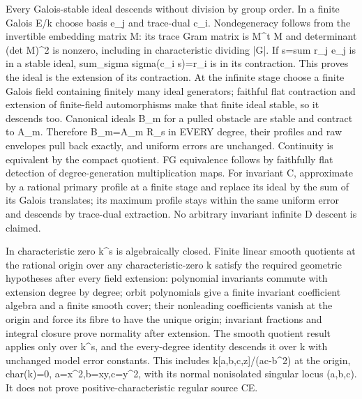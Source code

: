 Every Galois-stable ideal descends without division by group order. In a finite Galois E/k choose basis e\_j and trace-dual c\_i. Nondegeneracy follows from the invertible embedding matrix M: its trace Gram matrix is M\textasciicircum{}t M and determinant (det M)\textasciicircum{}2 is nonzero, including in characteristic dividing |G|. If s=sum r\_j e\_j is in a stable ideal, sum\_sigma sigma(c\_i s)=r\_i is in its contraction. This proves the ideal is the extension of its contraction. At the infinite stage choose a finite Galois field containing finitely many ideal generators; faithful flat contraction and extension of finite-field automorphisms make that finite ideal stable, so it descends too. Canonical ideals B\_m for a pulled obstacle are stable and contract to A\_m. Therefore B\_m=A\_m R\_s in EVERY degree, their profiles and raw envelopes pull back exactly, and uniform errors are unchanged. Continuity is equivalent by the compact quotient. FG equivalence follows by faithfully flat detection of degree-generation multiplication maps. For invariant C, approximate by a rational primary profile at a finite stage and replace its ideal by the sum of its Galois translates; its maximum profile stays within the same uniform error and descends by trace-dual extraction. No arbitrary invariant infinite D descent is claimed.

In characteristic zero k\textasciicircum{}s is algebraically closed. Finite linear smooth quotients at the rational origin over any characteristic-zero k satisfy the required geometric hypotheses after every field extension: polynomial invariants commute with extension degree by degree; orbit polynomials give a finite invariant coefficient algebra and a finite smooth cover; their nonleading coefficients vanish at the origin and force its fibre to have the unique origin; invariant fractions and integral closure prove normality after extension. The smooth quotient result applies only over k\textasciicircum{}s, and the every-degree identity descends it over k with unchanged model error constants. This includes k[a,b,c,z]/(ac-b\textasciicircum{}2) at the origin, char(k)=0, a=x\textasciicircum{}2,b=xy,c=y\textasciicircum{}2, with its normal nonisolated singular locus (a,b,c). It does not prove positive-characteristic regular source CE.

